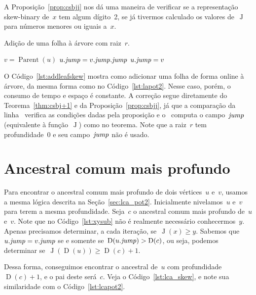 \documentclass[main.tex]{subfiles}
\newcommand{\Par}{\operatorname{Parent}}
\newcommand{\Dep}{\operatorname{D}}
\newcommand{\J}{\operatorname{J}}
\begin{document}
A Proposição~\ref{prop:csbjj} nos dá uma maneira de verificar se a representação skew-binary de~$x$ tem algum dígito~2, se já tivermos calculado os valores de~$\J$ para números menores ou iguais a~$x$.

\renewcommand{\root}{\mathit{root}}
\begin{algorithm}
\caption{Adição de uma folha à árvore com raiz~$r$.} \label{lst:addleafskew}
\begin{algorithmic}[1]
		\State $v = \Par(u)$
		\If{$v.\jmp \neq r \textbf{ and } \Dep(v) - \Dep(v.\jmp) = \Dep(v.\jmp) - \Dep(v.\jmp.\jmp)$} \label{lst:addleafskew:if}
			\State $u.\mathit{jump} = v.\mathit{jump}.\mathit{jump}$
		\Else
			\State $u.\mathit{jump} = v$
		\EndIf
	\EndFunction
\end{algorithmic}
\end{algorithm}

O Código~\ref{lst:addleafskew} mostra como adicionar uma folha de forma online à árvore, da mesma forma como no Código~\ref{lst:lapot2}. Nesse caso, porém, o consumo de tempo e espaço é constante. A correção segue diretamente do Teorema~\ref{thm:csbj+1} e da Proposição~\ref{prop:csbjj}, já que a comparação da linha~ verifica as condições dadas pela proposição e o~ computa o campo~$\mathit{jump}$ (equivalente à função~$\J$) como no teorema. Note que a raiz~$r$ tem profundidade~0 e seu campo~$\mathit{jump}$ não é usado.

\section{Ancestral comum mais profundo}

Para encontrar o ancestral comum mais profundo de dois vértices~$u$ e~$v$, usamos a mesma lógica descrita na Seção~\ref{sec:lca_pot2}. Inicialmente nivelamos~$u$ e~$v$ para terem a mesma profundidade. Seja~$c$ o ancestral comum mais profundo de~$u$ e~$v$. Note que no Código~\ref{lst:xysub} não é realmente necessário conhecermos~$y$. Apenas precisamos determinar, a cada iteração, se~$\J(x) \geq y$. Sabemos que~${u.\mathit{jump} = v.\mathit{jump}}$ se e somente se~${\Dep(u.\jmp) > \Dep(c)}$, ou seja, podemos determinar se~${\J(\Dep(u)) \geq \Dep(c) + 1}$.

Dessa forma, conseguimos encontrar o ancestral de~$u$ com profundidade~$\Dep(c) + 1$, e o pai deste será~$c$. Veja o Código~\ref{lst:lca_skew}, e note sua similaridade com o Código~\ref{lst:lcapot2}.
\end{document}
